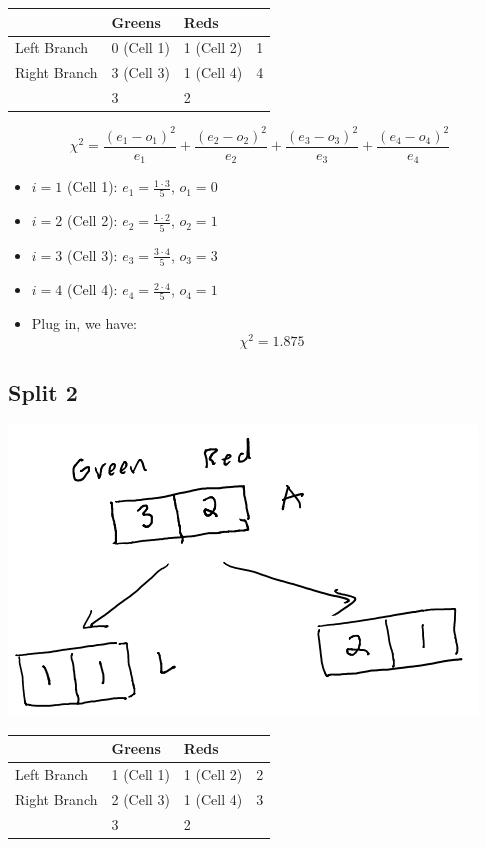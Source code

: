 \documentclass[
]{article}
\begin{document}
\begin{longtable}[]{@{}llll@{}}
\toprule
& Greens & Reds & \\
\midrule
\endhead
Left Branch & 0 (Cell 1) & 1 (Cell 2) & 1 \\
Right Branch & 3 (Cell 3) & 1 (Cell 4) & 4 \\
& 3 & 2 & \\
\bottomrule
\end{longtable}

\[\chi^2 = \frac{(e_1-o_1)^2}{e_1}+\frac{(e_2-o_2)^2}{e_2}+\frac{(e_3-o_3)^2}{e_3}+\frac{(e_4-o_4)^2}{e_4}\]

\begin{itemize}
\item
  \(i=1\) (Cell 1): \(e_1 = \frac{1\cdot 3}{5}\), \(o_1 = 0\)
\item
  \(i=2\) (Cell 2): \(e_2 = \frac{1\cdot 2}{5}\), \(o_2 = 1\)
\item
  \(i=3\) (Cell 3): \(e_3 = \frac{3\cdot 4}{5}\), \(o_3 = 3\)
\item
  \(i=4\) (Cell 4): \(e_4 = \frac{2\cdot 4}{5}\), \(o_4 = 1\)
\item
  Plug in, we have: \[\chi^2 = 1.875\]
\end{itemize}

\hypertarget{split-2}{%
\subsection{Split 2}\label{split-2}}

\includegraphics{images/im3.png}

\begin{longtable}[]{@{}llll@{}}
\toprule
& Greens & Reds & \\
\midrule
\endhead
Left Branch & 1 (Cell 1) & 1 (Cell 2) & 2 \\
Right Branch & 2 (Cell 3) & 1 (Cell 4) & 3 \\
& 3 & 2 & \\
\bottomrule
\end{longtable}
\end{document}

